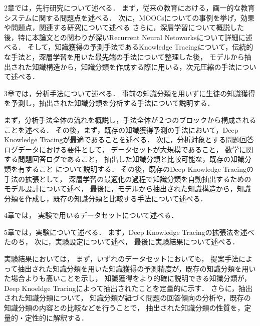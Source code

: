 2章では，先行研究について述べる．
まず，従来の教育における，画一的な教育システムに関する問題点を述べる．
次に，MOOCsについての事例を挙げ，効果や問題点，関連する研究について述べる
さらに，深層学習について概説した後，特に本論文との関わりが深いRecurrent Neural Netoworksについて詳細に述べる．
そして，知識獲得の予測手法であるKnowledge Tracingについて，伝統的な手法と，深層学習を用いた最先端の手法について整理した後，
モデルから抽出された知識構造から，知識分類を作成する際に用いる，次元圧縮の手法について述べる．


3章では，分析手法について述べる．
事前の知識分類を用いずに生徒の知識獲得を予測し，抽出された知識分類を分析する手法について説明する．

まず，分析手法全体の流れを概説し，手法全体が２つのブロックから構成されることを述べる．
その後，まず，既存の知識獲得予測の手法において，Deep Knowledge Tracingが最適であることを述べる．
次に，分析対象とする問題回答ログデータにおける要件として，
データセットが大規模であること，
数学に関する問題回答ログであること，
抽出した知識分類と比較可能な，既存の知識分類を有すること
について説明する．
その後，既存のDeep Knowledge Tracingの手法の拡張として，
深層学習の最適化の過程で知識分類を自動抽出するためのモデル設計について述べ，
最後に，モデルから抽出された知識構造から，知識分類を作成し，既存の知識分類と比較する手法について述べる．


4章では，
実験で用いるデータセットについて述べる．


5章では，実験について述べる．
まず，Deep Knowledge Tracingの拡張法を述べたのち，
次に，実験設定について述べ，
最後に実験結果について述べる．

実験結果においては，
まず，いずれのデータセットにおいても，
提案手法によって抽出された知識分類を用いた知識獲得の予測精度が，既存の知識分類を用いた場合よりも高いことを示し，
知識獲得をより的確に説明できる知識分類が，Deep Knoeldge Tracingによって抽出されたことを定量的に示す．
さらに，抽出された知識分類について，
知識分類が紐づく問題の回答傾向の分析や，既存の知識分類の内容との比較などを行うことで，
抽出された知識分類の性質を，定量的・定性的に解釈する．

